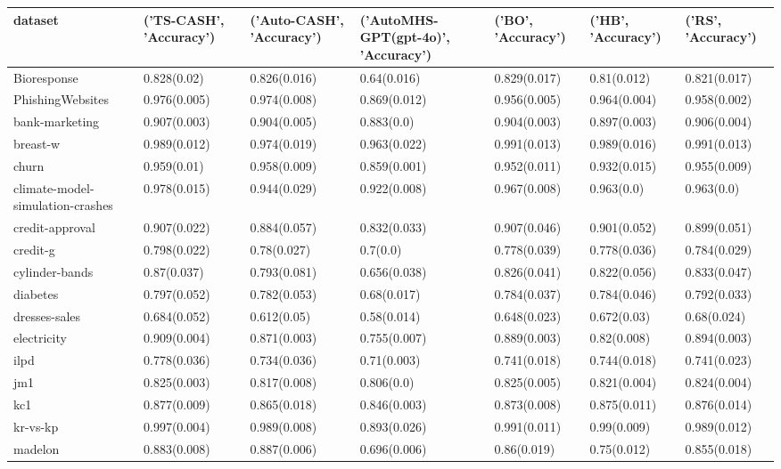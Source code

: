 \begin{tabular}{lllllll}
\toprule
dataset & ('TS-CASH', 'Accuracy') & ('Auto-CASH', 'Accuracy') & ('AutoMHS-GPT(gpt-4o)', 'Accuracy') & ('BO', 'Accuracy') & ('HB', 'Accuracy') & ('RS', 'Accuracy') \\
\midrule
Bioresponse & 0.828(0.02) & 0.826(0.016) & 0.64(0.016) & 0.829(0.017) & 0.81(0.012) & 0.821(0.017) \\
PhishingWebsites & 0.976(0.005) & 0.974(0.008) & 0.869(0.012) & 0.956(0.005) & 0.964(0.004) & 0.958(0.002) \\
bank-marketing & 0.907(0.003) & 0.904(0.005) & 0.883(0.0) & 0.904(0.003) & 0.897(0.003) & 0.906(0.004) \\
breast-w & 0.989(0.012) & 0.974(0.019) & 0.963(0.022) & 0.991(0.013) & 0.989(0.016) & 0.991(0.013) \\
churn & 0.959(0.01) & 0.958(0.009) & 0.859(0.001) & 0.952(0.011) & 0.932(0.015) & 0.955(0.009) \\
climate-model-simulation-crashes & 0.978(0.015) & 0.944(0.029) & 0.922(0.008) & 0.967(0.008) & 0.963(0.0) & 0.963(0.0) \\
credit-approval & 0.907(0.022) & 0.884(0.057) & 0.832(0.033) & 0.907(0.046) & 0.901(0.052) & 0.899(0.051) \\
credit-g & 0.798(0.022) & 0.78(0.027) & 0.7(0.0) & 0.778(0.039) & 0.778(0.036) & 0.784(0.029) \\
cylinder-bands & 0.87(0.037) & 0.793(0.081) & 0.656(0.038) & 0.826(0.041) & 0.822(0.056) & 0.833(0.047) \\
diabetes & 0.797(0.052) & 0.782(0.053) & 0.68(0.017) & 0.784(0.037) & 0.784(0.046) & 0.792(0.033) \\
dresses-sales & 0.684(0.052) & 0.612(0.05) & 0.58(0.014) & 0.648(0.023) & 0.672(0.03) & 0.68(0.024) \\
electricity & 0.909(0.004) & 0.871(0.003) & 0.755(0.007) & 0.889(0.003) & 0.82(0.008) & 0.894(0.003) \\
ilpd & 0.778(0.036) & 0.734(0.036) & 0.71(0.003) & 0.741(0.018) & 0.744(0.018) & 0.741(0.023) \\
jm1 & 0.825(0.003) & 0.817(0.008) & 0.806(0.0) & 0.825(0.005) & 0.821(0.004) & 0.824(0.004) \\
kc1 & 0.877(0.009) & 0.865(0.018) & 0.846(0.003) & 0.873(0.008) & 0.875(0.011) & 0.876(0.014) \\
kr-vs-kp & 0.997(0.004) & 0.989(0.008) & 0.893(0.026) & 0.991(0.011) & 0.99(0.009) & 0.989(0.012) \\
madelon & 0.883(0.008) & 0.887(0.006) & 0.696(0.006) & 0.86(0.019) & 0.75(0.012) & 0.855(0.018) \\

\end{tabular}
